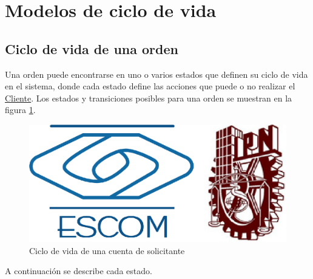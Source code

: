 
\section{Modelos de ciclo de vida}

	\hypertarget{CV:CuentaSolicitante}{}
	\subsection{Ciclo de vida de una orden}

		Una orden puede encontrarse en uno o varios estados que definen su ciclo de vida en el sistema, donde cada estado define las acciones que puede o no realizar el \hyperlink{A:Cliente}{Cliente}. Los estados y transiciones posibles para una orden se muestran en la figura \ref{fig:CV:CuentaSolcitante}.

		\begin{figure}[h]
			
			\begin{center}				
				
				\includegraphics[scale=0.35]{imagenes/CiclosDeVida/cv-CuentaSolicitante.jpg}
				\caption{Ciclo de vida de una cuenta de solicitante}
				\label{fig:CV:CuentaSolcitante}
				
			\end{center}
			
		\end{figure}
	
		A continuación se describe cada estado.

